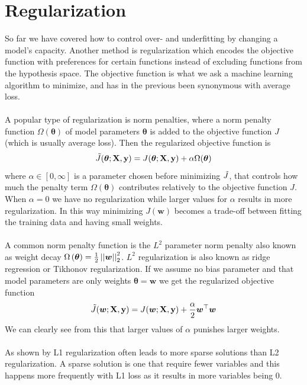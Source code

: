 \section{Regularization}
So far we have covered how to control over- and underfitting by changing a model's capacity. Another method is regularization which encodes the objective function with preferences for certain functions instead of excluding functions from the hypothesis space. The objective function is what we ask a machine learning algorithm to minimize, and has in the previous been synonymous with average loss. \\
\\
A popular type of regularization is norm penalties, where a norm penalty function $\Omega(\boldsymbol{\theta})$ of model parameters $\boldsymbol{\theta}$ is added to the objective function  $J$ (which is usually average loss). Then the regularized objective function is
\begin{equation} \label{eq:reg_obj_func}
    \Tilde{J}(\boldsymbol{\theta}; \mathbf{X}, \mathbf{y}) = J(\boldsymbol{\theta}; \mathbf{X}, \mathbf{y}) + \alpha \Omega(\boldsymbol{\theta})
\end{equation}
where $\alpha \in [0, \infty]$ is a parameter chosen before minimizing $\Tilde{J}$, that controls how much the penalty term $ \Omega(\boldsymbol{\theta})$ contributes relatively to the objective function $J$. When $\alpha=0$ we have no regularization while larger values for $\alpha$ results in more regularization. In this way minimizing $J(\mathbf{w})$ becomes a trade-off between fitting the training data and having small weights.\\
\\
A common norm penalty function is the $L^2$ parameter norm penalty also known as weight decay $\Omega \left (\boldsymbol{\theta}\right) = \frac{1}{2} \left |\left |\boldsymbol{w}\right|\right|_2^2$. $L^2$ regularization is also known as ridge regression or Tikhonov regularization. If we assume no bias parameter and that model parameters are only weights $\boldsymbol{\theta} = \boldsymbol{w}$ we get the regularized objective function
\begin{equation*} 
    \Tilde{J}(\boldsymbol{w}; \mathbf{X}, \mathbf{y}) = J(\boldsymbol{w}; \mathbf{X}, \mathbf{y}) + \frac{\alpha}{2} \boldsymbol{w}^\top \boldsymbol{w}
\end{equation*}
We can clearly see from this that larger values of $\alpha$ punishes larger weights. \\
\\
As shown by \cite{Goodfellow-et-al-2016} L1 regularization often leads to more sparse solutions than L2 regularization. A sparse solution is one that require fewer variables and this happens more frequently with L1 loss as it results in more variables being 0.\\
